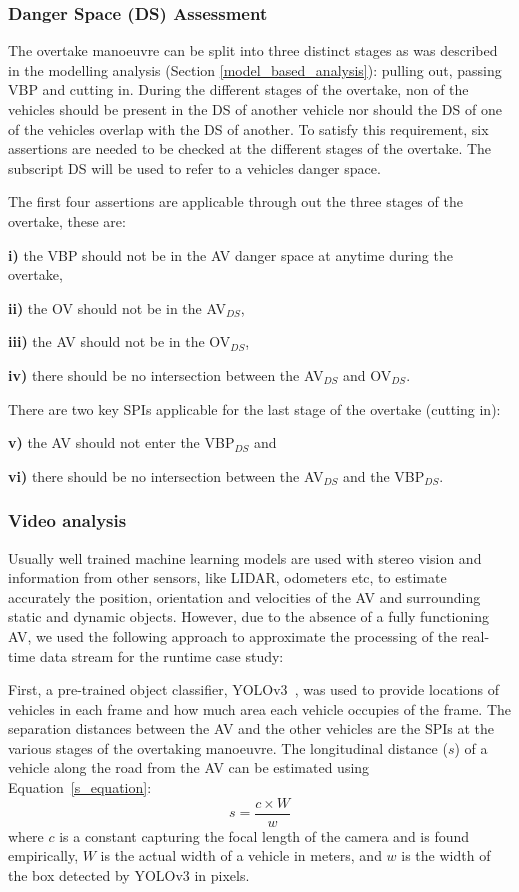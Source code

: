 \subsubsection{Danger Space (DS) Assessment}
\label{DS_assessment}

The overtake manoeuvre can be split into three distinct stages as was described in the modelling analysis (Section \ref{model_based_analysis}): pulling out, passing VBP and cutting in.
%
During the different stages of the overtake, non of the vehicles should be present in the DS of another vehicle nor should the DS of one of the vehicles overlap with the DS of another. 
%
To satisfy this requirement, six assertions are needed to be checked at the different stages of the overtake.
%
The subscript DS will be used to refer to a vehicles danger space.

The first four assertions are applicable through out the three stages of the overtake, these are:

\noindent \textbf{i)} the VBP should not be in the AV danger space at anytime during the overtake, 

\noindent \textbf{ii)} the OV should not be in the AV$_{DS}$, 

\noindent \textbf{iii)} the AV should not be in the OV$_{DS}$, 

\noindent \textbf{iv)} there should be no intersection between the AV$_{DS}$ and OV$_{DS}$.

There are two key SPIs applicable for the last stage of the overtake (cutting in):

\noindent \textbf{v)} the AV should not enter the VBP$_{DS}$ and 

\noindent \textbf{vi)} there should be no intersection between the AV$_{DS}$ and the VBP$_{DS}$. 

\subsubsection{Video analysis}
%
Usually well trained machine learning models are used with stereo vision and information from other sensors, like LIDAR, odometers etc, to estimate accurately the position, orientation and velocities of the AV and surrounding static and dynamic objects.
%
However, due to the absence of a fully functioning AV, we used the following approach to approximate the processing of the real-time data stream for the runtime case study:

First, a pre-trained object classifier, YOLOv3~\cite{Yolo}, was used to provide locations of vehicles in each frame and how much area each vehicle occupies of the frame. 
%
The separation distances between the AV and the other vehicles are the SPIs at the various stages of the overtaking manoeuvre. 
%
The longitudinal distance ($s$) of a vehicle along the road from the AV can be estimated 
using Equation~\ref{s_equation}:
\begin{equation}\label{s_equation}
    s = \frac{c\times W}{w}
\end{equation}
where $c$ is a constant capturing the focal length of the camera and is found empirically, $W$ is the actual width of a vehicle in meters, and $w$ is the width of the box detected by YOLOv3 in pixels.

